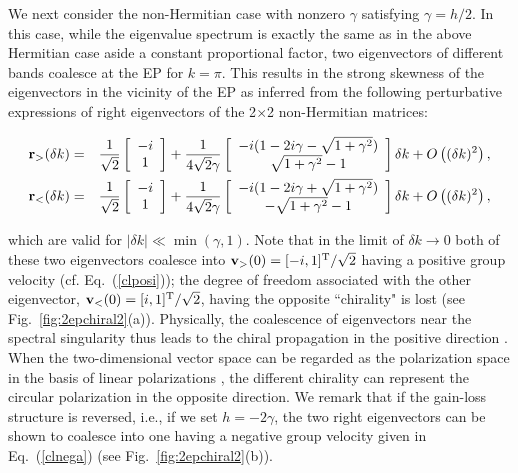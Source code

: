 \documentclass{tADP2e}
\theoremstyle{plain}
\newcommand{\eqn}[1]{
\begin{eqnarray}
	#1
\end{eqnarray}
}
\theoremstyle{plain}
\theoremstyle{definition}
\begin{document}
{We next consider the non-Hermitian case with nonzero $\gamma$ satisfying $\gamma=h/2$. In this case, while the eigenvalue spectrum is exactly the same as in the above Hermitian case aside a constant proportional factor, two eigenvectors of different bands coalesce at the EP for $k=\pi$. This results in the strong skewness of the eigenvectors in the vicinity of the EP as inferred from the following perturbative expressions of right eigenvectors of the 2$\times$2 non-Hermitian matrices:
\eqn{%
{\bf r}_{>}(\delta k)&=&\frac{1}{\sqrt{2}}\left[\begin{array}{c}
-i\\
1
\end{array}\right]+\frac{1}{4\sqrt{2}\gamma}\left[\begin{array}{c}
-i(1-2i\gamma-\sqrt{1+\gamma^2})\\
\sqrt{1+\gamma^2}-1
\end{array}\right]\delta k+O\left((\delta k)^2\right),\nonumber
\\
{\bf r}_{<}(\delta k)&=&\frac{1}{\sqrt{2}}\left[\begin{array}{c}
-i\\
1
\end{array}\right]+\frac{1}{4\sqrt{2}\gamma}\left[\begin{array}{c}
-i(1-2i\gamma+\sqrt{1+\gamma^2})\\
-\sqrt{1+\gamma^2}-1
\end{array}\right]\delta k+O\left((\delta k)^2\right),\nonumber
}
which are valid for $|\delta k|\ll \min(\gamma,1)$.  Note that in the limit of $\delta k\to 0$ both of these two eigenvectors coalesce into ${\bf v}_{>}(0)=[-i,1]^{\rm T}/\sqrt{2}$ having a positive group velocity (cf. Eq.~(\ref{clposi})); the degree of freedom associated with the other eigenvector, ${\bf v}_{<}(0)=[i,1]^{\rm T}/\sqrt{2}$, having the opposite ``chirality" is lost (see Fig.~\ref{fig:2epchiral2}(a)).
 Physically, the coalescence of eigenvectors near the spectral singularity thus leads to the chiral propagation in the positive direction \cite{YA18}.  When the two-dimensional vector space can be regarded as the polarization space in the basis of linear polarizations \cite{CA172,BB18}, the different chirality can represent the circular polarization in the opposite direction.  
We remark that if the gain-loss structure is reversed, i.e., if we set $h=-2\gamma$, the two right eigenvectors can be shown to coalesce into one having a negative group velocity given in Eq.~(\ref{clnega})  (see Fig.~\ref{fig:2epchiral2}(b)). 

}
\end{document}
